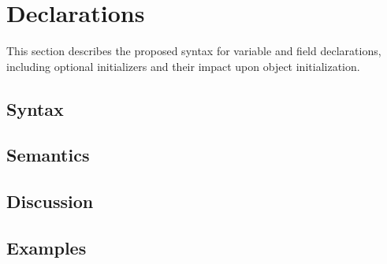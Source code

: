 \section{Declarations}
\label{Declarations}

This section describes the proposed syntax for variable and field declarations, including
optional initializers and their impact upon object initialization.

\subsection{Syntax}

\subsection{Semantics}

\subsection{Discussion}

\subsection{Examples}

